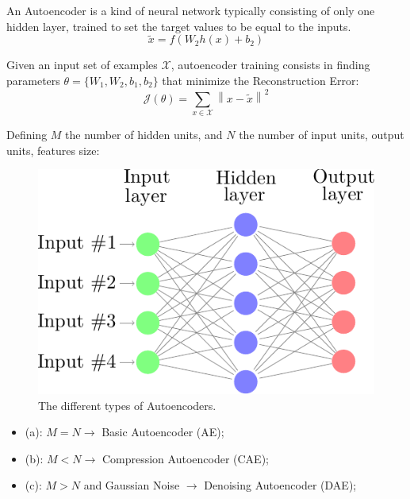 An Autoencoder is a kind of neural network typically consisting of only one hidden layer, trained to set the target values to be equal to the inputs.
\begin{equation} %
\tilde{x} = f(W_{2}h(x) +b_{2})
\end{equation}



Given an input set of examples $\mathcal{X}$, autoencoder training consists
in finding parameters $\theta=\{W_{1},W_{2},b_{1},b_{2}\}$ that
minimize the Reconstruction Error:
\begin{equation}\label{eq:obAE}
\mathcal{J}(\theta)=\sum_{x\in{\mathcal{X}}}\left\| x - \tilde{x}\right\|^{2}
\end{equation}

Defining $M$ the number of hidden units, and $N$ the number of input units, output units, features size:

\begin{figure}
	\centering
	\includegraphics[width=\columnwidth]{img/autoencoder}
	\caption{The different types of Autoencoders.}
	\label{fig:backg:dnn:AE}
\end{figure}

\begin{itemize}
	\item (a):  $M=N \rightarrow$ Basic Autoencoder (AE);
	\item (b):  $M<N \rightarrow$ Compression Autoencoder (CAE);
	\item (c):  $M>N$ and Gaussian Noise $\rightarrow$ Denoising Autoencoder (DAE);
\end{itemize}



